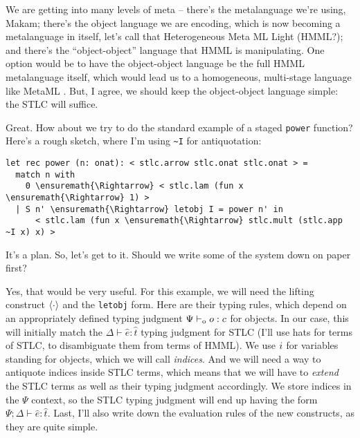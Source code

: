 \heroADVISOR{} We are getting into many levels of meta -- there's the
metalanguage we're using, Makam; there's the object language we are
encoding, which is now becoming a metalanguage in itself, let's call
that Heterogeneous Meta ML Light (HMML?); and there's the
``object-object'' language that HMML is manipulating. One option would
be to have the object-object language be the full HMML metalanguage
itself, which would lead us to a homogeneous, multi-stage language like
MetaML \citep{metaml-main-reference}. But, I agree, we should keep the
object-object language simple: the STLC will suffice.

\heroSTUDENT{} Great. How about we try to do the standard example of a staged
\texttt{power} function? Here's a rough sketch, where I'm using
\texttt{\textasciitilde{}I} for antiquotation:

\begin{verbatim}
let rec power (n: onat): < stlc.arrow stlc.onat stlc.onat > =
  match n with
    0 \ensuremath{\Rightarrow} < stlc.lam (fun x \ensuremath{\Rightarrow} 1) >
  | S n' \ensuremath{\Rightarrow} letobj I = power n' in
      < stlc.lam (fun x \ensuremath{\Rightarrow} stlc.mult (stlc.app ~I x) x) >
\end{verbatim}

\heroADVISOR{} It's a plan. So, let's get to it. Should we write some of the
system down on paper first?

\heroSTUDENT{} Yes, that would be very useful. For this example, we will need
the lifting construct \(\langle\cdot\rangle\) and the \texttt{letobj} form.
Here are their typing rules, which depend on an appropriately defined
typing judgment \(\Psi \vdash_{\text{o}} o : c\) for objects. In our case, this
will initially match the \(\Delta \vdash \hat{e} : \hat{t}\) typing
judgment for STLC (I'll use hats for terms of STLC, to disambiguate them
from terms of HMML). We use \(i\) for variables standing for
objects, which we will call \emph{indices}. And we will need a way to
antiquote indices inside STLC terms, which means that we will have to
\emph{extend} the STLC terms as well as their typing judgment
accordingly. We store indices in the \(\Psi\) context, so the STLC
typing judgment will end up having the form
\(\Psi; \Delta \vdash \hat{e} : \hat{t}\). Last, I'll also write down
the evaluation rules of the new constructs, as they are quite simple.

\newcommand\stlce[0]{\hat{e}}
\newcommand\stlct[0]{\hat{t}}
\newcommand\stlc[1]{\hat{#1}}

